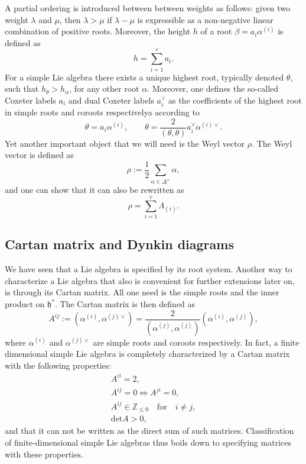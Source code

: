 A partial ordering is introduced between between weights as follows: given two weight $\lambda$ and $\mu$, then $\lambda>\mu$ if $\lambda-\mu$ is expressible as a non-negative linear combination of positive roots. Moreover, the height $h$ of a root $\beta = a_i\alpha^{(i)}$ is defined as 
\begin{equation}
    h = \sum_{i=1}^r a_i.
\end{equation}
For a simple Lie algebra there exists a unique highest root, typically denoted $\theta$, such that $h_\theta>h_\alpha$, for any other root $\alpha$. Moreover, one defines the so-called Coxeter labels $a_i$ and dual Coxeter labels $a_i^\vee$ as the coefficients of the highest root in simple roots and coroots respectivelya according to
\begin{equation}
    \theta = a_i\alpha^{(i)},\qquad \theta = \frac{2}{(\theta,\theta)}a_i^\vee \alpha^{(i)\vee}.
\end{equation}
Yet another important object that we will need is the Weyl vector $\rho$. The Weyl vector is defined as 
\begin{equation}
    \rho := \frac{1}{2}\sum_{\alpha\in\Delta^+}\alpha,
\end{equation}
and one can show that it can also be rewritten as
\begin{equation}
    \rho = \sum_{i=1}^r \Lambda_{(i)}.
\end{equation}

\subsection{Cartan matrix and Dynkin diagrams}
We have seen that a Lie algebra is specified by its root system. Another way to characterize a Lie algebra that also is convenient for further extensions later on, is through its Cartan matrix. All one need is the simple roots and the inner product on $\mathfrak{h}^*$. The Cartan matrix is then defined as 
\begin{equation}
    A^{ij} := (\alpha^{(i)},\alpha^{(j)\vee})  = \frac{2}{(\alpha^{(j)},\alpha^{(j)})}(\alpha^{(i)},\alpha^{(j)}),
\end{equation}
where $\alpha^{(i)}$ and $\alpha^{(j)\vee}$ are simple roots and coroots respectively. In fact, a finite dimensional simple Lie algebra is completely characterized by a Cartan matrix with the following properties:
\begin{equation}
    \begin{aligned}
        A^{ii} = 2,\\
        A^{ij} = 0 \Longleftrightarrow A^{ji} = 0,\\
        A^{ij}\in \mathbb{Z}_{\leq 0} \quad\text{for}\quad i\neq j,\\
        \text{det}A >0,
    \end{aligned}
\end{equation}
and that it can not be written as the direct sum of such matrices. Classification of finite-dimensional simple Lie algebras thus boils down to specifying matrices with these properties. 


